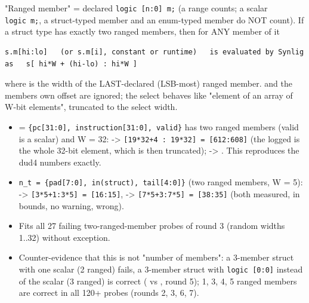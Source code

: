 \begin{record}

"Ranged member" = declared \texttt{logic\ [n:\allowbreak{}0]\ m;} (a
\code{[0:0]} range counts; a scalar \texttt{logic\ m;}, a struct-typed
member and an enum-typed member do NOT count). If a struct type has
exactly two ranged members, then for ANY member  of it

\begin{lstlisting}[language={}]
s.m[hi:lo]   (or s.m[i], constant or runtime)   is evaluated by Synlig as   s[ hi*W + (hi-lo) : hi*W ]
\end{lstlisting}

where  is the width of the LAST-declared (LSB-most) ranged
member.  and the member\textquotesingle s own offset are
ignored; the select behaves like "element  of an array of W-bit
elements", truncated to the select width.

\begin{itemize}
\tightlist
\item
   =
  \texttt{\{pc[31:\allowbreak{}0],\allowbreak{}\ instruction[31:\allowbreak{}0],\allowbreak{}\ valid\}}
  has two ranged members (valid is a scalar) and W = 32:
   -\textgreater{}
  \texttt{[19*32+\allowbreak{}4\ :\allowbreak{}\ 19*32]\ =\allowbreak{}\ [612:\allowbreak{}608]}
  (the logged \code{[639:608]} is the whole 32-bit element, which is
  then truncated); \code{[24:20]} -\textgreater{} \code{[768+4:768]}.
  This reproduces the dud4 numbers exactly.
\item
  \texttt{n\_\allowbreak{}t\ =\allowbreak{}\ \{pad[7:\allowbreak{}0],\allowbreak{}\ in(struct),\allowbreak{}\ tail[4:\allowbreak{}0]\}}
  (two ranged members, W = 5):  -\textgreater{}
  \texttt{[3*5+\allowbreak{}1:\allowbreak{}3*5]\ =\allowbreak{}\ [16:\allowbreak{}15]},
   -\textgreater{}
  \texttt{[7*5+\allowbreak{}3:\allowbreak{}7*5]\ =\allowbreak{}\ [38:\allowbreak{}35]}
  (both measured, in bounds, no warning, wrong).
\item
  Fits all 27 failing two-ranged-member probes of round 3 (random widths
  1..32) without exception.
\item
  Counter-evidence that this is not "number of members": a 3-member
  struct with one scalar (2 ranged) fails, a 3-member struct with
  \texttt{logic\ [0:\allowbreak{}0]} instead of the scalar (3 ranged) is
  correct ( vs , round 5); 1, 3, 4, 5 ranged members
  are correct in all 120+ probes (rounds 2, 3, 6, 7).
\end{itemize}


\end{record}
